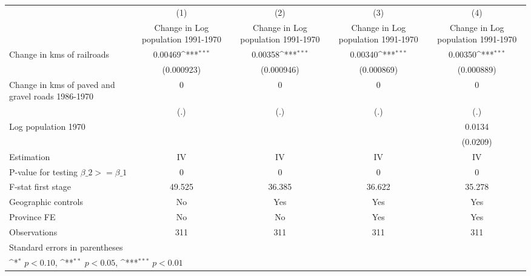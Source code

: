 {
\def\sym#1{\ifmmode^{#1}\else\(^{#1}\)\fi}
\begin{tabular}{l*{4}{c}}
\hline\hline
                &\multicolumn{1}{c}{(1)}&\multicolumn{1}{c}{(2)}&\multicolumn{1}{c}{(3)}&\multicolumn{1}{c}{(4)}\\
                &\multicolumn{1}{c}{Change in Log population 1991-1970}&\multicolumn{1}{c}{Change in Log population 1991-1970}&\multicolumn{1}{c}{Change in Log population 1991-1970}&\multicolumn{1}{c}{Change in Log population 1991-1970}\\
\hline
Change in kms of railroads&  0.00469\sym{***}&  0.00358\sym{***}&  0.00340\sym{***}&  0.00350\sym{***}\\
                &(0.000923)         &(0.000946)         &(0.000869)         &(0.000889)         \\
[1em]
Change in kms of paved and gravel roads 1986-1970&        0         &        0         &        0         &        0         \\
                &      (.)         &      (.)         &      (.)         &      (.)         \\
[1em]
Log population 1970&                  &                  &                  &   0.0134         \\
                &                  &                  &                  & (0.0209)         \\
\hline
Estimation      &       IV         &       IV         &       IV         &       IV         \\
P-value for testing $\beta\_2 >= \beta\_1$&        0         &        0         &        0         &        0         \\
F-stat first stage&   49.525         &   36.385         &   36.622         &   35.278         \\
Geographic controls&       No         &      Yes         &      Yes         &      Yes         \\
Province FE     &       No         &       No         &      Yes         &      Yes         \\
Observations    &      311         &      311         &      311         &      311         \\
\hline\hline
\multicolumn{5}{l}{\footnotesize Standard errors in parentheses}\\
\multicolumn{5}{l}{\footnotesize \sym{*} \(p<0.10\), \sym{**} \(p<0.05\), \sym{***} \(p<0.01\)}\\
\end{tabular}
}
